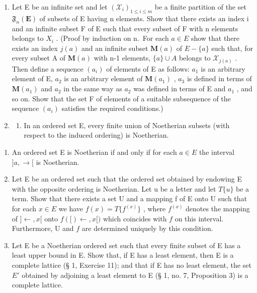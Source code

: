 \begin{enumerate}
\def\labelenumi{\arabic{enumi}.}
\setcounter{enumi}{27}
\item
  Let E be an infinite set and let \((\mathcal{X}_{i})_{1\leqslant i\leqslant m}\) be a finite partition of the set \(\mathfrak{F}_{n}(\mathbf{E})\) of subsets of E having n elements. Show that there exists an index i and an infinite subset F of E such that every subset of F with n elements belongs to \(X_{i}\) . (Proof by induction on n.~For each \(a\in E\) show that there exists an index \(j(a)\) and an infinite subset \(\mathbf{M}(a)\) of \(E-\{a\}\) such that, for every subset A of \(\mathbf{M}(a)\) with n-1 elements, \(\{a\}\cup A\) belongs to \(\mathcal{X}_{j(a)}\) . Then define a sequence \((a_{i})\) of elements of E as follows: \(a_{1}\) is an arbitrary element of E, \(a_{2}\) is an arbitrary element of \(\mathbf{M}(a_{1})\) , \(a_{3}\) is defined in terms of \(\mathbf{M}(a_{1})\) and \(a_{2}\) in the same way as \(a_{2}\) was defined in terms of E and \(a_{1}\) , and so on. Show that the set F of elements of a suitable subsequence of the sequence \((a_{i})\) satisfies the required conditions.)
\item
  \begin{enumerate}
  \def\labelenumii{(\alph{enumii})}
  \tightlist
  \item
    In an ordered set E, every finite union of Noetherian subsets (with respect to the induced ordering) is Noetherian.
  \end{enumerate}
\end{enumerate}

\begin{enumerate}
\def\labelenumi{(\alph{enumi})}
\setcounter{enumi}{1}
\item
  An ordered set E is Noetherian if and only if for each \(a \in E\) the interval \(]a, \rightarrow[\) is Noetherian.
\item
  Let E be an ordered set such that the ordered set obtained by endowing E with the opposite ordering is Noetherian. Let u be a letter and let \(T\{u\}\) be a term. Show that there exists a set U and a mapping f of E onto U such that for each \(x \in E\) we have \(f(x) = T\{f^{(x)}\}\) , where \(f^{(x)}\) denotes the mapping of \(]\leftarrow, x[\) onto \(f([)\leftarrow, x[)\) which coincides with \(f\) on this interval. Furthermore, U and \(f\) are determined uniquely by this condition.
\item
  Let E be a Noetherian ordered set such that every finite subset of E has a least upper bound in E. Show that, if E has a least element, then E is a complete lattice (§ 1, Exercise 11); and that if E has no least element, the set \(E'\) obtained by adjoining a least element to E (§ 1, no. 7, Proposition 3) is a complete lattice.
\end{enumerate}

